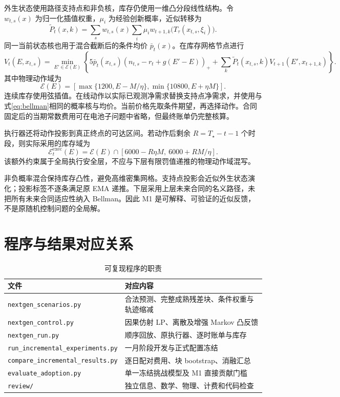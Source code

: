 \documentclass[UTF8,a4paper,zihao=-4,fontset=mac]{ctexart}
\newcommand{\pos}[1]{\left(#1\right)_+}
\begin{document}
外生状态使用路径支持点和非负核，库存仍使用一维凸分段线性结构。令 \(w_{t,s}(x)\) 为归一化插值权重，\(\mu_i\) 为经验创新概率，近似转移为
\begin{equation}
\widetilde P_t(x,k)=\sum_s w_{t,s}(x)\sum_i\mu_i
w_{t+1,k}\bigl(T_\tau(x_{t,s},\xi_i)\bigr).
\end{equation}
同一当前状态核也用于混合截断后的条件均价 \(\bar p_t(x)\)。在库存网格节点进行
\begin{equation}\label{eq:bellman}
V_t(E,x_{t,s})=\min_{E'\in\mathcal E(E)}\left\{
5\bar p_t(x_{t,s})\pos{n_{t,s}-r_t+g(E'-E)}
+\sum_k\widetilde P_t(x_{t,s},k)V_{t+1}(E',x_{t+1,k})\right\}.
\end{equation}
其中物理动作域为
\begin{equation}
\mathcal E(E)=[\max\{1200,E-M/\eta\},\min\{10800,E+\eta M\}].
\end{equation}
连续库存使用弦插值。在线动作以实际已观测净需求替换支持点净需求，并使用与式\eqref{eq:bellman}相同的概率核与均价。当前价格先取条件期望，再选择动作。合同固定后的当期常数费用可在电池子问题中省略，但最终账单仍完整核算。

执行器还将动作投影到真正终点的可达区间。若动作后剩余 \(R=T_\star-t-1\) 个时段，则实际采用的库存域为
\begin{equation}
\mathcal E_t^{\mathrm{exec}}(E)=\mathcal E(E)\cap[6000-R\eta M,\ 6000+RM/\eta].
\end{equation}
该额外约束属于全局执行安全层，不应与下层有限罚值递推的物理动作域混写。

非负概率混合保持库存凸性，避免高维密集网格。支持点投影会近似外生状态演化；投影标签不逐条满足原 EMA 递推。下层采用上层未来合同的名义路径，未把所有未来合同适应性纳入 Bellman。因此 M1 是可解释、可验证的近似反馈，不是原随机控制问题的全局解。

\section{程序与结果对应关系}
\begin{table}[H]\centering\small\caption{可复现程序的职责}
\begin{tabular}{p{6.2cm}p{8cm}}\toprule
文件&对应内容\\\midrule
\texttt{nextgen\_scenarios.py}&合法预测、完整成熟残差块、条件权重与轨迹缩减\\
\texttt{nextgen\_control.py}&因果仿射 LP、离散及增强 Markov 凸反馈\\
\texttt{nextgen\_run.py}&顺序回放、原执行器、逐时账单与库存\\
\texttt{run\_incremental\_experiments.py}&一月阶段开发与正式配置冻结\\
\texttt{compare\_incremental\_results.py}&逐日配对费用、块 bootstrap、消融汇总\\
\texttt{evaluate\_adoption.py}&单一冻结挑战模型及 M1 直接贡献门槛\\
\texttt{review/}&独立信息、数学、物理、计费和代码检查\\\bottomrule
\end{tabular}\end{table}
\end{document}
